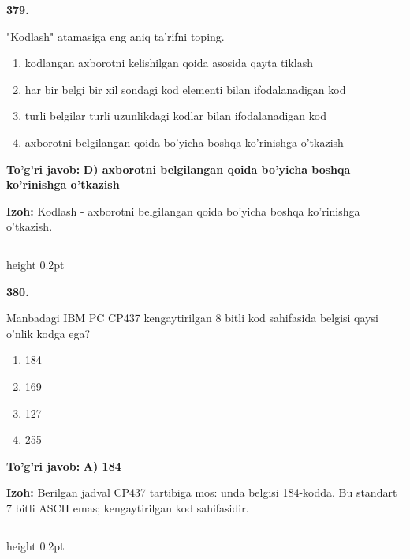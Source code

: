 \documentclass[10pt,a4paper,oneside]{article}
\begin{document}
\noindent\textbf{\color{ink}379.}
\par
"Kodlash" atamasiga eng aniq ta'rifni toping.
\begin{enumerate}[label=\Alph*),leftmargin=9mm]
\item kodlangan axborotni kelishilgan qoida asosida qayta tiklash
\item har bir belgi bir xil sondagi kod elementi bilan ifodalanadigan kod
\item turli belgilar turli uzunlikdagi kodlar bilan ifodalanadigan kod
\item axborotni belgilangan qoida bo'yicha boshqa ko'rinishga o'tkazish
\end{enumerate}
\begin{tcolorbox}[enhanced,breakable,colback=teal!4,colframe=teal!50!black,boxrule=0.5pt,arc=1.1mm,left=3mm,right=3mm,top=1.7mm,bottom=1.7mm,before skip=2mm,after skip=2mm]
\textbf{\color{teal}To'g'ri javob:} \textbf{D) axborotni belgilangan qoida bo'yicha boshqa ko'rinishga o'tkazish}
\par\smallskip
\textbf{Izoh:} Kodlash - axborotni belgilangan qoida bo'yicha boshqa ko'rinishga o'tkazish.
\end{tcolorbox}
\vspace{2mm}\hrule height 0.2pt \vspace{3mm}

\noindent\textbf{\color{ink}380.}
\par
Manbadagi IBM PC CP437 kengaytirilgan 8 bitli kod sahifasida \texttt{\textcopyright{}} belgisi qaysi o'nlik kodga ega?
\begin{enumerate}[label=\Alph*),leftmargin=9mm]
\item 184
\item 169
\item 127
\item 255
\end{enumerate}
\begin{tcolorbox}[enhanced,breakable,colback=teal!4,colframe=teal!50!black,boxrule=0.5pt,arc=1.1mm,left=3mm,right=3mm,top=1.7mm,bottom=1.7mm,before skip=2mm,after skip=2mm]
\textbf{\color{teal}To'g'ri javob:} \textbf{A) 184}
\par\smallskip
\textbf{Izoh:} Berilgan jadval CP437 tartibiga mos: unda \textcopyright{} belgisi 184-kodda. Bu standart 7 bitli ASCII emas; kengaytirilgan kod sahifasidir.
\end{tcolorbox}
\vspace{2mm}\hrule height 0.2pt \vspace{3mm}
\end{document}
